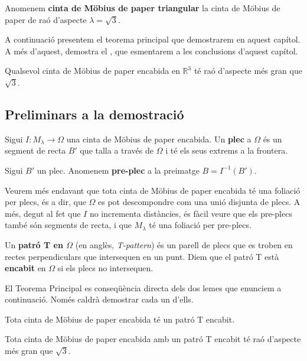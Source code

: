 \begin{ex}
    Anomenem \textbf{cinta de Möbius de paper triangular} la cinta de Möbius de paper de raó d'aspecte $\lambda = \sqrt{3}$.
\end{ex}

A continuació presentem el teorema principal que demostrarem en aquest capítol. A més d'aquest, \cite{schwartz2024} demostra el , que esmentarem a les conclusions d'aquest capítol. 
\begin{teo}\label{teo:Main Schwartz}
    Qualsevol cinta de Möbius de paper encabida en $\mathbb R^3$ té raó d'aspecte més gran que $\sqrt{3}$.
\end{teo}


\subsection{Preliminars a la demostració}
\begin{defi}
    Sigui $I:M_\lambda\to\Omega$ una cinta de Möbius de paper encabida. Un \textbf{plec} a $\Omega$ és un segment de recta $B'$ que talla a través de $\Omega$ i té els seus extrems a la frontera.
\end{defi}

\begin{defi}
    Sigui $B'$ un plec. Anomenem \textbf{pre-plec} a la preimatge $B=I^{-1}(B')$.
\end{defi}
Veurem més endavant que tota cinta de Möbius de paper encabida té una foliació per plecs, és a dir, que $\Omega$ es pot descompondre com una unió disjunta de plecs. A més, degut al fet que $I$ no incrementa distàncies, és fàcil veure que els pre-plecs també són segments de recta, i que $M_\lambda$ té una foliació per pre-plecs.
\begin{defi}
    Un \textbf{patró T en $\Omega$} (en anglès, \textit{T-pattern}) és un parell de plecs que es troben en rectes perpendiculars que intersequen en un punt. Diem que el patró T està \textbf{encabit} en $\Omega$ si els plecs no intersequen.
\end{defi}

El Teorema Principal es conseqüència directa dels dos lemes que enunciem a continuació. Només caldrà demostrar cada un d'ells.
\begin{lema}[\textbf{T}]\label{lema T}
    Tota cinta de Möbius de paper encabida té un patró T encabit.
\end{lema}

\begin{lema}[\textbf{G}]\label{lema G}
    Tota cinta de Möbius de paper encabida amb un patró T encabit té raó d'aspecte més gran que $\sqrt{3}$.
\end{lema}

